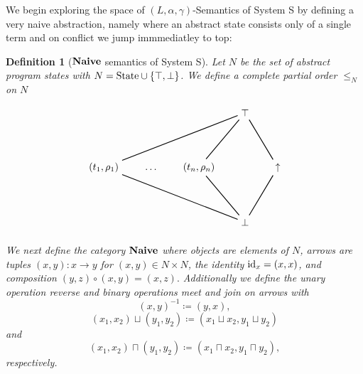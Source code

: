 \documentclass{article}
\newtheorem{definition}[theorem]{Definition}
\newcommand{\fail}{\ensuremath \text{$\uparrow$}}
\newcommand{\State}{\ensuremath \text{State}}
\newcommand{\id}{\ensuremath \operatorname{id}}
\newcommand{\Naive}{\ensuremath \mathbf{Naive}}
\begin{document}
We begin exploring the space of $(L,\alpha,\gamma)$-Semantics of System S by defining a very naive abstraction, namely where an abstract state consists only of a single term and on conflict we jump immmediatley to top:
 
\begin{definition}[$\Naive$ semantics of System S] \normalfont
  Let $N$ be the set of abstract program states with $N = \State \cup \lbrace \top, \bot \rbrace$. We define a complete partial order $\leq_N$ on $N$
  \[
    \begin{tikzpicture}
     \matrix (m) [matrix of math nodes, row sep=4em, column sep=2em]
    {              &        &             & \top &       \\
      (t_1,\rho_1) & \ldots & (t_n,\rho_n) &      & \fail \\
                   &        &             & \bot &       \\
    };

    \draw [thick] (m-2-1) -- (m-1-4);
    \draw [thick] (m-2-3) -- (m-1-4);
    \draw [thick] (m-2-5) -- (m-1-4);
    \draw [thick] (m-3-4) -- (m-2-1);
    \draw [thick] (m-3-4) -- (m-2-3);
    \draw [thick] (m-3-4) -- (m-2-5);
    \end{tikzpicture}
  \]

  We next define the category $\Naive$ where objects are elements of $N$, arrows are tuples $(x,y) : x \rightarrow y$ for $(x,y) \in N \times N$, the identity $\id_x = (x,x)$, and  composition $(y,z) \circ (x,y) = (x,z).$ Additionally we define the unary operation \emph{reverse} and binary operations \emph{meet} and \emph{join} on arrows with \[(x,y)^{-1} \coloneq (y,x),\] \[ (x_1,x_2) \sqcup (y_1,y_2) \coloneq (x_1 \sqcup x_2, y_1 \sqcup y_2) \] and \[ (x_1,x_2) \sqcap (y_1,y_2) \coloneq (x_1 \sqcap x_2, y_1 \sqcap y_2), \] respectively.
\end{definition}
\end{document}
